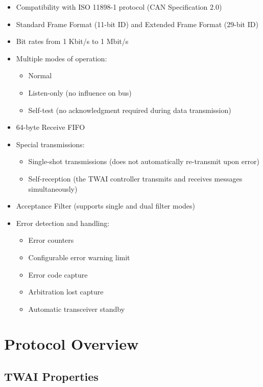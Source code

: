\documentclass[main\_\_EN.tex]{subfiles}
\begin{document}
\begin{itemize}
    \item Compatibility with ISO 11898-1 protocol (CAN Specification 2.0)
    \item Standard Frame Format (11-bit ID) and Extended Frame Format (29-bit ID)
    \item Bit rates from 1 Kbit/s to 1 Mbit/s
    \item Multiple modes of operation:
    \begin{itemize}
        \item Normal
        \item Listen-only (no influence on bus)
        \item Self-test (no acknowledgment required during data transmission)
    \end{itemize}
    \item 64-byte Receive FIFO
    \item Special transmissions:
    \begin{itemize}
        \item Single-shot transmissions (does not automatically re-transmit upon error)
        \item Self-reception (the TWAI controller transmits and receives messages simultaneously)
    \end{itemize}
    \item Acceptance Filter (supports single and dual filter modes)
    \item Error detection and handling:
    \begin{itemize}
        \item Error counters
        \item Configurable error warning limit
        \item Error code capture
        \item Arbitration lost capture
    \item Automatic transceiver standby
    \end{itemize}
\end{itemize}

\section{Protocol Overview}
\label{sec:twai-functional-protocol}

\subsection{TWAI Properties}
\end{document}
